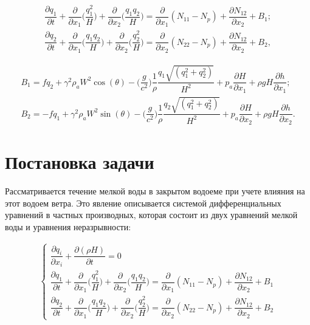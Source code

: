 \documentclass[14pt]{extreport}
\begin{document}
\begin{equation}\label{eq:shallow_water:22}
\begin{aligned}
\dfrac{\partial q_1}{\partial t} + \dfrac{\partial}{\partial x_1} \bigg(\dfrac{q_1^2}{H}\bigg)+\dfrac{\partial }{\partial x_2}\bigg(\dfrac{q_1 q_2}{H}\bigg) = \dfrac{\partial}{\partial x_1} (N_{11}-N_p) + \dfrac{\partial N_{12}}{\partial x_2} + B_1; \\
\dfrac{\partial q_2}{\partial t} + \dfrac{\partial}{\partial x_1} \bigg(\dfrac{q_1 q_2}{H}\bigg)+\dfrac{\partial }{\partial x_2}\bigg(\dfrac{q_2^2}{H}\bigg) = \dfrac{\partial}{\partial x_2} (N_{22}-N_p) + \dfrac{\partial N_{12}}{\partial x_2} + B_2,
\end{aligned}
\end{equation}


\begin{equation*}
\begin{aligned}
B_1=fq_2+\gamma^2\rho_aW^2\cos(\theta)-\bigg(\dfrac{g}{c^2}\bigg)\dfrac{1}{\rho}\dfrac{q_1\sqrt{(q_1^2+q_2^2)}}{H^2} + p_a \dfrac{\partial H}{\partial x_1} + \rho gH\dfrac{\partial h}{\partial x_1}; \\
B_2=-fq_1+\gamma^2\rho_aW^2\sin(\theta)-\bigg(\dfrac{g}{c^2}\bigg)\dfrac{1}{\rho}\dfrac{q_2\sqrt{(q_1^2+q_2^2)}}{H^2} + p_a \dfrac{\partial H}{\partial x_2} + \rho gH\dfrac{\partial h}{\partial x_2}.
\end{aligned}
\end{equation*}

\chapter{Постановка задачи}

Рассматривается течение мелкой воды в закрытом водоеме при учете влияния на этот водоем ветра. Это явление описывается системой дифференциальных уравнений в частных производных\cite{bib:calc:yurko:2004}, которая состоит из двух уравнений мелкой воды и уравнения неразрывности:

\begin{eqnarray}\label{eq:task:1}
\begin{cases}
\dfrac{ \partial q_i}{\partial x_i} + \dfrac{\partial(\rho H)}{\partial t} = 0 \\
\dfrac{\partial q_1}{\partial t} + \dfrac{\partial}{\partial x_1} \bigg(\dfrac{q_1^2}{H}\bigg)+\dfrac{\partial }{\partial x_2}\bigg(\dfrac{q_1 q_2}{H}\bigg) = \dfrac{\partial}{\partial x_1} (N_{11}-N_p) + \dfrac{\partial N_{12}}{\partial x_2} + B_1 \\
\dfrac{\partial q_2}{\partial t} + \dfrac{\partial}{\partial x_1} \bigg(\dfrac{q_1 q_2}{H}\bigg)+\dfrac{\partial }{\partial x_2}\bigg(\dfrac{q_2^2}{H}\bigg) = \dfrac{\partial}{\partial x_2} (N_{22}-N_p) + \dfrac{\partial N_{12}}{\partial x_2} + B_2
\end{cases}
\end{eqnarray}
\end{document}
